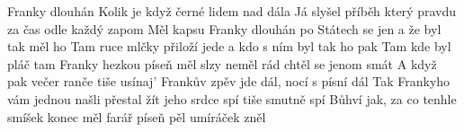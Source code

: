 \begin{TEXT}{Franky dlouhán}
\SLOKA Kolik je  když  černé  \NL
lidem nad   dála \NL
Já slyšel příběh který  pravdu  \NL
za čas odle  každý zapom 
\REFREN  Měl kapsu  Franky dlouhán \NL
po Státech  se jen  \NL
a že byl  tak  měl ho  \NL
Tam ruce  mlčky přiloží \NL
{} jede  \NL
a  kdo s ním  byl \NL
tak ho  pak  
\SLOKA Tam kde byl pláč tam Franky hezkou píseň měl \NL
slzy neměl rád chtěl se jenom smát \NL
A když pak večer ranče tiše usínaj' \NL
Frankův zpěv jde dál, nocí s písní dál 
\SLOKA Tak Frankyho vám jednou našli přestal žít \NL
jeho srdce spí tiše smutně spí \NL
Bůhví jak, za co tenhle smíšek konec měl \NL
farář píseň pěl umíráček zněl \NL
\end{TEXT}
